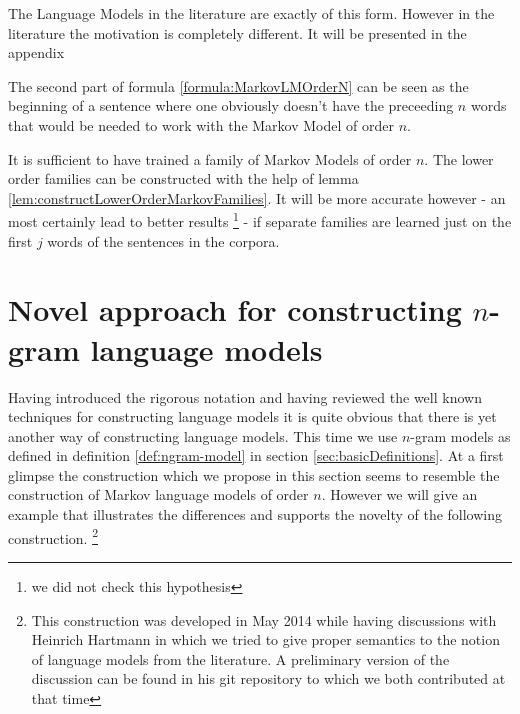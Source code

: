 \documentclass[•]{book}
\begin{document}
\begin{remark}
The Language Models in the literature are exactly of this form.
However in the literature the motivation is completely different. 
It will be presented in the appendix 

The second part of formula \ref{formula:MarkovLMOrderN} can be seen as the beginning of a sentence where one obviously doesn't have the preceeding $n$ words that would be needed to work with the Markov Model of order $n$. 

It is sufficient to have trained a family of Markov Models of order $n$. 
The lower order families can be constructed with the help of lemma \ref{lem:constructLowerOrderMarkovFamilies}. 
It will be more accurate however - an most certainly lead to better results \footnote{we did not check this hypothesis} - if separate families are learned just on the first $j$ words of the sentences in the corpora.  
\end{remark}


\section{Novel approach for constructing $n$-gram language models}
Having introduced the rigorous notation and having reviewed the well known techniques for constructing language models it is quite obvious that there is yet another way of constructing language models. 
This time we use $n$-gram models as defined in definition \ref{def:ngram-model} in section \ref{sec:basicDefinitions}. 
At a first glimpse the construction which we propose in this section seems to resemble the construction of Markov language models of order $n$. 
However we will give an example that illustrates the differences and supports the novelty of the following construction. \footnote{This construction was developed in May 2014 while having discussions with Heinrich Hartmann in which we tried to give proper semantics to the notion of language models from the literature. A preliminary version of the discussion can be found in his git repository to which we both contributed at that time }
\end{document}
